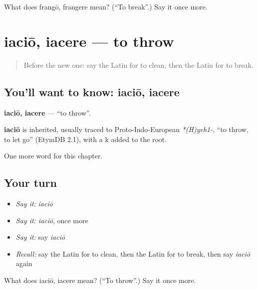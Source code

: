 \begin{tcolorbox}[breakable,colback=teal!4,colframe=teal!35!black,title={Before you move on}]
What does frangō, frangere mean? (\textquotedblleft{}To break\textquotedblright{}.) Say it once more.
\end{tcolorbox}
\section[iaciō, iacere]{iaciō, iacere — to throw}

\label{lesson:LA-C156-iacio}



\begin{quote}
Before the new one: say the Latin for to clean, then the Latin for to break.
\end{quote}

\subsection*{You'll want to know: iaciō, iacere}
\textbf{iaciō, iacere} — \textquotedblleft{}to throw\textquotedblright{}.

\begin{cousinweb}
\textbf{iaciō} is inherited, usually traced to Proto-Indo-European \emph{*(H)yeh1-}, \textquotedblleft{}to throw, to let go\textquotedblright{} (EtymDB 2.1), with a k added to the root.
\end{cousinweb}

\begin{grammarlens}[title={What you've built}]
One more word for this chapter.
\end{grammarlens}

\subsection*{Your turn}
\begin{itemize}
\raggedright
  \item \emph{Say it:} \emph{iaciō}
  \item \emph{Say it:} \emph{iaciō}, once more
  \item \emph{Say it:} say \emph{iaciō}
  \item \emph{Recall:} say the Latin for to clean, then the Latin for to break, then say \emph{iaciō} again
\end{itemize}

\begin{tcolorbox}[breakable,colback=teal!4,colframe=teal!35!black,title={Before you move on}]
What does iaciō, iacere mean? (\textquotedblleft{}To throw\textquotedblright{}.) Say it once more.
\end{tcolorbox}
